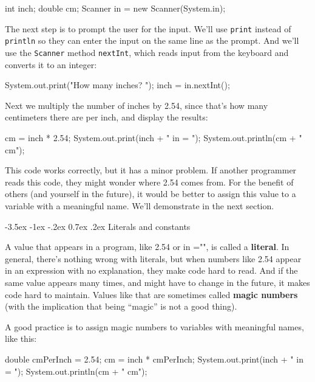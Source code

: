 \documentclass[12pt]{book}
\makeatletter
\theoremstyle{exercise}
\newcommand{\java}[1]{\verb"#1"}
\renewcommand{\section}{\@startsection{section}{1}{\z@}%
    {-3.5ex \@plus -1ex \@minus -.2ex}%
    {0.7ex \@plus.2ex}%
    {\normalfont\Large\bfseries}}
\newcommand{\java}[1]{\lstinline{#1}} %
\makeatother
\begin{document}
\begin{code}
    int inch;
    double cm;
    Scanner in = new Scanner(System.in);
\end{code}

The next step is to prompt the user for the input.
We'll use \java{print} instead of \java{println} so they can enter the input on the same line as the prompt.
And we'll use the \java{Scanner} method \java{nextInt}, which reads input from the keyboard and converts it to an integer:

\begin{code}
    System.out.print("How many inches? ");
    inch = in.nextInt();
\end{code}

Next we multiply the number of inches by 2.54, since that's how many centimeters there are per inch, and display the results:

\begin{code}
    cm = inch * 2.54;
    System.out.print(inch + " in = ");
    System.out.println(cm + " cm");
\end{code}

This code works correctly, but it has a minor problem.
If another programmer reads this code, they might wonder where 2.54 comes from.
For the benefit of others (and yourself in the future), it would be better to assign this value to a variable with a meaningful name.
We'll demonstrate in the next section.


\section{Literals and constants}


A value that appears in a program, like 2.54 or \java{" in ="}, is called a {\bf literal}.
In general, there's nothing wrong with literals, but when numbers like 2.54 appear in an expression with no explanation, they make code hard to read.
And if the same value appears many times, and might have to change in the future, it makes code hard to maintain.
Values like that are sometimes called {\bf magic numbers} (with the implication that being ``magic'' is not a good thing).

A good practice is to assign magic numbers to variables with meaningful names, like this:

\begin{code}
    double cmPerInch = 2.54;
    cm = inch * cmPerInch;
    System.out.print(inch + " in = ");
    System.out.println(cm + " cm");
\end{code}
\end{document}
